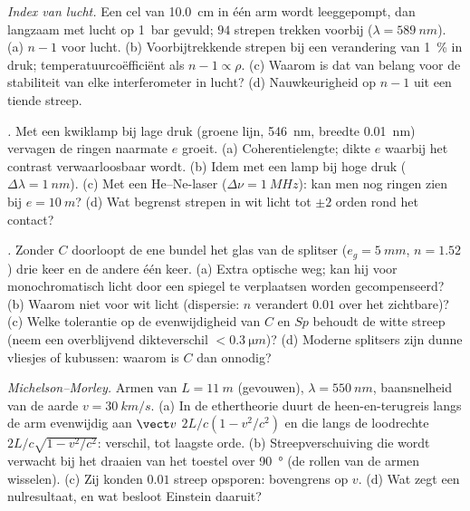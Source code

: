 \begin{exercise}[$\star\star$]\label{exo:b2:michelson:6}
\emph{Index van lucht.} Een cel van \qty{10.0}{cm} in één arm wordt leeggepompt, dan
langzaam met lucht op \qty{1}{bar} gevuld; $94$ strepen trekken voorbij
($\lambda = \qty{589}{nm}$).
(a) $n - 1$ voor lucht. (b) Voorbijtrekkende strepen bij een verandering van
\qty{1}{\%} in
druk; temperatuurcoëfficiënt als $n - 1 \propto \rho$. (c) Waarom is dat van belang
voor de stabiliteit van elke interferometer in lucht? (d) Nauwkeurigheid op
$n - 1$ uit een tiende streep.
\end{exercise}

\begin{exercise}[$\star\star$]\label{exo:b2:michelson:7}
\emph{.} Met een kwiklamp bij lage druk (groene lijn,
\qty{546}{nm}, breedte \qty{0.01}{nm}) vervagen de ringen naarmate $e$
groeit. (a) Coherentie\-lengte;
dikte $e$ waarbij het contrast verwaarloosbaar wordt. (b) Idem
met een lamp bij hoge druk ($\Delta\lambda = \qty{1}{nm}$). (c) Met een He--Ne-laser
($\Delta\nu = \qty{1}{MHz}$): kan men nog ringen zien bij $e = \qty{10}{m}$? (d) Wat
begrenst strepen in wit licht tot $\pm2$ orden rond het contact?
\end{exercise}

\begin{exercise}[$\star\star$]\label{exo:b2:michelson:8}
\emph{.} Zonder $C$ doorloopt de ene bundel het glas van de
splitser ($e_g = \qty{5}{mm}$, $n = 1.52$) drie keer en de andere één keer. (a)
Extra optische weg; kan hij voor monochromatisch licht door een spiegel te
verplaatsen worden gecompenseerd? (b) Waarom niet voor wit licht (dispersie: $n$
verandert $0.01$ over het zichtbare)? (c) Welke tolerantie op de
evenwijdigheid van $C$ en $Sp$ behoudt de witte streep (neem een overblijvend
dikteverschil $< \qty{0.3}{\micro m}$)? (d) Moderne splitsers zijn
dunne vliesjes of kubussen: waarom is $C$ dan onnodig?
\end{exercise}

\begin{exercise}[$\star\star$]\label{exo:b2:michelson:9}
\emph{Michelson--Morley.} Armen van $L = \qty{11}{m}$ (gevouwen),
$\lambda = \qty{550}{nm}$,
baansnelheid van de aarde $v = \qty{30}{km/s}$. (a) In de ethertheorie duurt de
heen-en-terugreis langs de arm evenwijdig aan $\vect v$ $2L/c(1 - v^2/c^2)$
en die langs de loodrechte $2L/c\sqrt{1 - v^2/c^2}$: verschil, tot laagste
orde. (b) Streepverschuiving die wordt verwacht bij het draaien van het
toestel over \qty{90}{\degree}
(de rollen van de armen wisselen). (c) Zij konden $0.01$ streep opsporen: bovengrens
op $v$. (d) Wat zegt een nulresultaat, en wat besloot Einstein daaruit?
\end{exercise}

